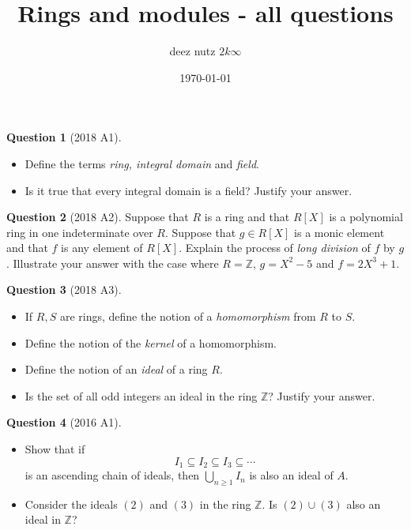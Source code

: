 \documentclass{article}
\title{Rings and modules - all questions}
\author{deez nutz $2k\infty$}
\date{\today}
\numberwithin{equation}{section}
\theoremstyle{definition}
\newtheorem{quest}{Question}
\newcommand{\Z}{\mathbb{Z}}
\renewcommand{\.}{\,.}
\begin{document}

\begin{quest}[2018 A1]

\begin{itemize}
\item Define the terms \textit{ring, integral domain} and \textit{field}.
\item Is it true that every integral domain is a field? Justify your answer.
\end{itemize}
\end{quest}

\begin{quest}[2018 A2]
Suppose that $R$ is a ring and that $R[X]$ is a polynomial ring in one indeterminate over $R$. Suppose that $g\in R[X]$ is a monic element and that $f$ is any element of $R[X]$. Explain the process of \textit{long division} of $f$ by $g$. Illustrate your answer with the case where $R=\Z$, $g=X^2-5$ and $f=2X^3+1$.
\end{quest}

\begin{quest}[2018 A3]

\begin{itemize}
\item If $R,S$ are rings, define the notion of a \textit{homomorphism} from $R$ to $S$.
\item Define the notion of the \textit{kernel} of a homomorphism.
\item Define the notion of an \textit{ideal} of a ring $R$.
\item Is the set of all odd integers an ideal in the ring $\Z$? Justify your answer.
\end{itemize}
\end{quest}

\begin{quest}[2016 A1]

\begin{itemize}
\item Show that if
\begin{equation*}
I_1\subseteq I_2 \subseteq I_3 \subseteq \cdots
\end{equation*}
is an ascending chain of ideals, then $\bigcup_{n\geq 1} I_n$ is also an ideal of $A$.
\item Consider the ideals $(2)$ and $(3)$ in the ring $\Z$. Is $(2)\cup(3)$ also an ideal in $\Z$?
\end{itemize}
\end{quest}
\end{document}
